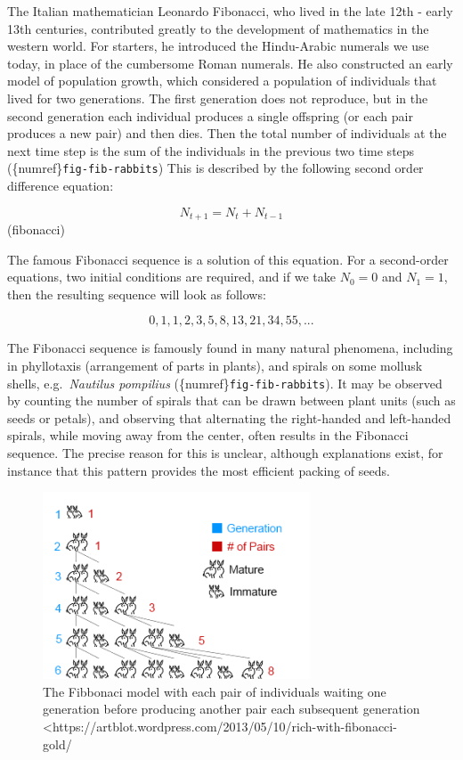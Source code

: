 \documentclass[
  letterpaper,
  DIV=11,
  numbers=noendperiod]{scrreprt}
\begin{document}
The Italian mathematician Leonardo Fibonacci, who lived in the late 12th
- early 13th centuries, contributed greatly to the development of
mathematics in the western world. For starters, he introduced the
Hindu-Arabic numerals we use today, in place of the cumbersome Roman
numerals. He also constructed an early model of population growth, which
considered a population of individuals that lived for two generations.
The first generation does not reproduce, but in the second generation
each individual produces a single offspring (or each pair produces a new
pair) and then dies. Then the total number of individuals at the next
time step is the sum of the individuals in the previous two time steps
(\{numref\}\texttt{fig-fib-rabbits}) This is described by the following
second order difference equation:

\[
N_{t+1} = N_t + N_{t-1}
\] (fibonacci)

The famous Fibonacci sequence is a solution of this equation. For a
second-order equations, two initial conditions are required, and if we
take \(N_0 = 0\) and \(N_1 = 1\), then the resulting sequence will look
as follows:

\[
0, 1, 1, 2, 3, 5, 8, 13, 21, 34, 55, ...
\]

The Fibonacci sequence is famously found in many natural phenomena,
including in phyllotaxis (arrangement of parts in plants), and spirals
on some mollusk shells, e.g.~\emph{Nautilus pompilius}
(\{numref\}\texttt{fig-fib-rabbits}). It may be observed by counting the
number of spirals that can be drawn between plant units (such as seeds
or petals), and observing that alternating the right-handed and
left-handed spirals, while moving away from the center, often results in
the Fibonacci sequence. The precise reason for this is unclear, although
explanations exist, for instance that this pattern provides the most
efficient packing of seeds.

\begin{figure}

{\centering \includegraphics{./images/fibonacci-rabbits.png}

}

\caption{The Fibbonaci model with each pair of individuals waiting one
generation before producing another pair each subsequent generation
\textless https://artblot.wordpress.com/2013/05/10/rich-with-fibonacci-gold/}

\end{figure}
\end{document}
